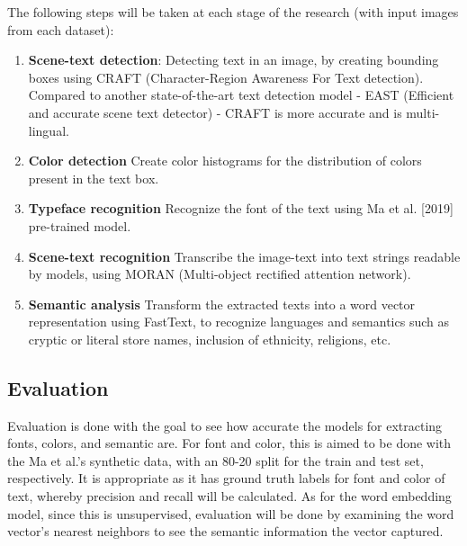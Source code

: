 The following steps will be taken at each stage of the research (with input images from each dataset):
\begin{enumerate}
    \item \textbf{Scene-text detection}: Detecting text in an image, by creating bounding boxes using CRAFT (Character-Region Awareness For Text detection). Compared to another state-of-the-art text detection model - EAST (Efficient and accurate scene text detector) - CRAFT is more accurate and is multi-lingual.
    \item \textbf{Color detection} Create color histograms for the distribution of colors present in the text box.
    \item \textbf{Typeface recognition} Recognize the font of the text using Ma et al. [2019] pre-trained model.
    \item \textbf{Scene-text recognition} Transcribe the image-text into text strings readable by models, using MORAN (Multi-object rectified attention network).
    \item \textbf{Semantic analysis} Transform the extracted texts into a word vector representation using FastText, to recognize languages and semantics such as cryptic or literal store names, inclusion of ethnicity, religions, etc.
\end{enumerate}



\subsection{Evaluation}
Evaluation is done with the goal to see how accurate the models for extracting fonts, colors, and semantic are. For font and color, this is aimed to be done with the Ma et al.'s synthetic data, with an 80-20 split for the train and test set, respectively. It is appropriate as it has ground truth labels for font and color of text, whereby precision and recall will be calculated. As for the word embedding model, since this is unsupervised, evaluation will be done by examining the word vector's nearest neighbors to see the semantic information the vector captured.